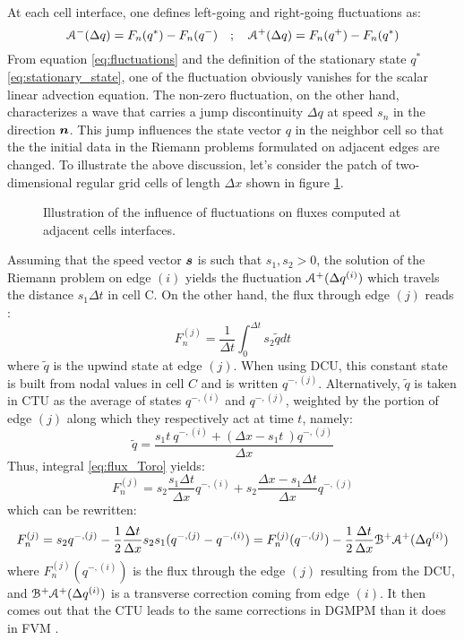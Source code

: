 At each cell interface, one defines left-going and right-going fluctuations as:
\begin{equation}
  \label{eq:fluctuations}
  \mathcal{A}^-(\Delta q) = F_n(q^*) - F_n(q^-) \quad ;  \quad \mathcal{A}^+(\Delta q) = F_n(q^+)-F_n(q^*) 
\end{equation}
From equation \eqref{eq:fluctuations} and the definition of the stationary state $q^*$ \eqref{eq:stationary_state}, one of the fluctuation obviously vanishes for the scalar linear advection equation.
The non-zero fluctuation, on the other hand, characterizes a wave that carries a jump discontinuity $\Delta q$ at speed $s_n$ in the direction ${\mathbf{\boldsymbol{n}}}$.
This jump influences the state vector $q$ in the neighbor cell so that the the initial data in the Riemann problems formulated on adjacent edges are changed.
To illustrate the above discussion, let's consider the patch of two-dimensional regular grid cells of length $\Delta x$ shown in figure \ref{fig:ctu_perso}.
\begin{figure}[ht]
  \centering
  
  \caption{Illustration of the influence of fluctuations on fluxes computed at adjacent cells interfaces.}
  \label{fig:ctu_perso}
\end{figure}
Assuming that the speed vector ${\mathbf{\boldsymbol{s}}}$ is such that $s_1,s_2>0$, the solution of the Riemann problem on edge $(i)$ yields the fluctuation $\mathcal{A}^+(\Delta q^{(i)})$ which travels the distance $s_1\Delta t$ in cell C.
On the other hand, the flux through edge $(j)$ reads \cite{Toro}:
\begin{equation}
  \label{eq:flux_Toro}
  F_n^{(j)}=\frac{1}{\Delta t}\int_{0}^{\Delta t} s_2 \tilde{q} dt
\end{equation}
where $\tilde{q}$ is the upwind state at edge $(j)$.
When using DCU, this constant state is built from nodal values in cell $C$ and is written $q^{-,(j)}$.
Alternatively, $\tilde{q}$ is taken in CTU as the average of states $q^{-,(i)}$ and $q^{-,(j)}$, weighted by the portion of edge $(j)$ along which they respectively act at time $t$, namely:
\begin{equation}
  \label{eq:mean_q}
  \tilde{q} = \frac{s_1 t \:q^{-,(i)} + (\Delta x - s_1t \:)q^{-,(j)} }{\Delta x}
\end{equation}
Thus, integral \eqref{eq:flux_Toro} yields:
\begin{equation}
  F_n^{(j)}=s_2 \frac{s_1 \Delta t}{\Delta x}q^{-,(i)}  + s_2\frac{\Delta x -s_1 \Delta t}{\Delta x} q^{-,(j)}
\end{equation}
which can be rewritten:
\begin{equation}
  \label{eq:corrected_flux}
  F_n^{(j)}=s_2q^{-,(j)} -  \frac{1}{2}\frac{\Delta t}{\Delta x}s_2s_1(q^{-,(j)}  - q^{-,(i)}) = F_n^{(j)}(q^{-,(j)}) - \frac{1}{2}\frac{\Delta t}{\Delta x}\mathcal{B}^+ \mathcal{A}^+(\Delta q^{(i)})
\end{equation}
where $F_n^{(j)}(q^{-,(i)})$ is the flux through the edge $(j)$ resulting from the DCU, and $\mathcal{B}^+ \mathcal{A}^+(\Delta q^{(i)})$ is a transverse correction coming from edge $(i)$.
It then comes out that the CTU leads to the same corrections in DGMPM than it does in FVM \cite{Leveque}.

